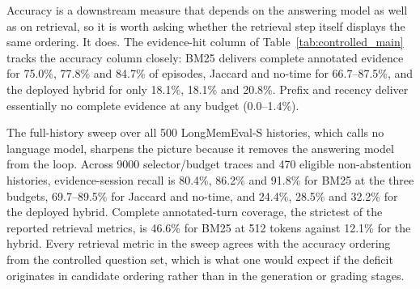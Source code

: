 \label{sec:ctrl_evidence}

Accuracy is a downstream measure that depends on the answering model as well as on
retrieval, so it is worth asking whether the retrieval step itself displays the same
ordering. It does. The evidence-hit column of Table~\ref{tab:controlled_main} tracks
the accuracy column closely: BM25 delivers complete annotated evidence for 75.0\%,
77.8\% and 84.7\% of episodes, Jaccard and no-time for 66.7--87.5\%, and the deployed
hybrid for only 18.1\%, 18.1\% and 20.8\%. Prefix and recency deliver essentially no
complete evidence at any budget (0.0--1.4\%).

The full-history sweep over all 500 LongMemEval-S histories, which calls no language
model, sharpens the picture because it removes the answering model from the loop.
Across 9000 selector/budget traces and 470 eligible non-abstention histories,
evidence-session recall is 80.4\%, 86.2\% and 91.8\% for BM25 at the three budgets,
69.7--89.5\% for Jaccard and no-time, and 24.4\%, 28.5\% and 32.2\% for the deployed
hybrid. Complete annotated-turn coverage, the strictest of the reported retrieval
metrics, is 46.6\% for BM25 at 512 tokens against 12.1\% for the hybrid. Every
retrieval metric in the sweep agrees with the accuracy ordering from the controlled
question set, which is what one would expect if the deficit originates in candidate
ordering rather than in the generation or grading stages.

